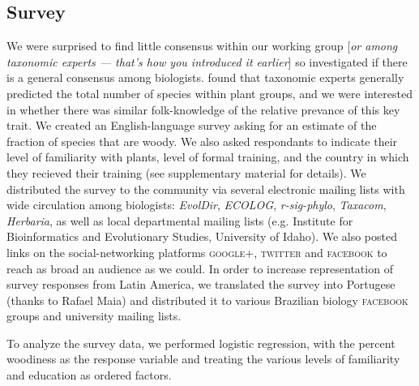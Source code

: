 \documentclass[12pt]{article}
\begin{document}
\subsection{Survey}

We were surprised to find little consensus within our working group
[\textit{or among taxonomic experts --- that's how you introduced it
  earlier}] so investigated if there is a general consensus among
biologists.
% 
\citet{joppa2010} found that taxonomic experts generally predicted the
total number of species within plant groups, and we were interested in
whether there was similar folk-knowledge of the relative prevance of
this key trait.
%
We created an English-language survey asking for an estimate of the
fraction of species that are woody.  We also asked respondants to
indicate their level of familiarity with plants, level of formal
training, and the country in which they recieved their training (see
supplementary material for details).
We distributed the survey to the community via several electronic
mailing lists with wide circulation among biologists: \emph{EvolDir},
\emph{ECOLOG}, \emph{r-sig-phylo}, \emph{Taxacom}, \emph{Herbaria}, as
well as local departmental mailing lists (e.g. Institute for
Bioinformatics and Evolutionary Studies, University of Idaho). We also
posted links on the social-networking platforms \textsc{google+},
\textsc{twitter} and \textsc{facebook} to reach as broad an audience
as we could.
In order to increase representation of survey responses from Latin
America, we translated the survey into Portugese (thanks to Rafael
Maia) and distributed it to various Brazilian biology
\textsc{facebook} groups and university mailing lists.

To analyze the survey data, we performed logistic regression, with the percent woodiness as the response variable \citep[for discussion as to why we used logistic regression, see][]{wartonarcsine} and treating the various levels of familiarity and education as ordered factors.
\end{document}
